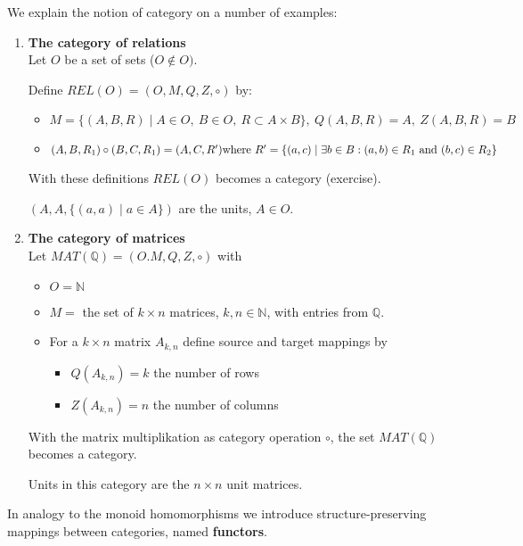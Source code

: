 We explain the notion of category on a number of examples:
\begin{enumerate}
  \item {\bf The category of relations} \\
  Let $O$ be a set of sets ($O \notin O)$. 
  
  Define $REL(O) = (O, M, Q, Z,\circ)$ by:
  \begin{itemize}
  	\item $M = \{ (A,B,R) \mid A \in O,\ B \in O,\ R \subset A \times B \},\
  	Q(A,B,R) = A, \ Z(A,B,R) = B$
  	\item $(A,B,R_1) \circ (B,C,R_1) = (A,C,R')\\
  	\text{where }R'= \{ (a,c) \mid \exists b \in B: (a,b)\in R_1\text{ and }(b,c)\in R_2 \}$
  \end{itemize}
  With these definitions $REL(O)$ becomes a category (exercise).
  
  $(A, A, \{(a, a) \mid a\in A \})$ are the units, $A\in O$.

  \item {\bf The category of matrices} \\
  Let $MAT(\mathbb{Q}) = (O. M, Q, Z, \circ)$ with
  \begin{itemize}
    \item $O = \mathbb{N}$
    \item $M = $ the set of $k \times n$ matrices, $k, n \in \mathbb{N}$, with
    entries from $\mathbb{Q}$.
    \item For a $k \times n$ matrix $A_{k,n}$ define source and target mappings
    by
    \begin{itemize}
	    \item[] $Q(A_{k,n}) = k$ the number of rows
  	  \item[] $Z(A_{k,n}) = n$ the number of columns
    \end{itemize}
  \end{itemize}
	With the matrix multiplikation as category operation $\circ$, the set
	$MAT(\mathbb{Q})$ becomes a category.
	
	Units in this category are the $n\times n$ unit matrices.
\end{enumerate}

In analogy to the monoid homomorphisms we introduce structure-preserving
mappings between categories, named {\bf functors}.

